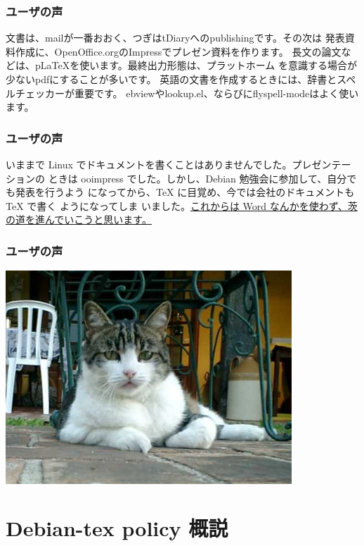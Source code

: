 \documentclass[cjk,dvipdfmx]{beamer}
\begin{document}
\begin{frame}
 \frametitle{ユーザの声}
文書は、mailが一番おおく、つぎはtDiaryへのpublishingです。その次は
発表資料作成に、OpenOffice.orgのImpressでプレゼン資料を作ります。
長文の論文などは、p\LaTeX を使います。最終出力形態は、プラットホーム
を意識する場合が少ないpdfにすることが多いです。
英語の文書を作成するときには、辞書とスペルチェッカーが重要です。
ebviewやlookup.el、ならびにflyspell-modeはよく使います。
\end{frame}

\begin{frame}
 \frametitle{ユーザの声}
いままで Linux でドキュメントを書くことはありませんでした。プレゼンテーションの
ときは ooimpress でした。しかし、Debian 勉強会に参加して、自分でも発表を行うよう
になってから、\TeX{} に目覚め、今では会社のドキュメントも \TeX{} で書く
ようになってしま
いました。\underline{これからは Word なんかを使わず、茨の道を進んでいこうと思います。}
\end{frame}

\begin{frame}
 \frametitle{ユーザの声}
 \begin{center}
  \includegraphics[height=8cm]{image200604/cat.png}
 \end{center}
\end{frame}


\section{Debian-tex policy 概説}
\end{document}
